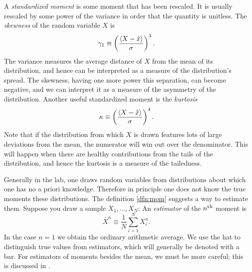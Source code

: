 \begin{example*}{}{}
A {\it standardized moment} is some moment
that has been rescaled. It is usually rescaled by some power of the variance in
order that the quantity is unitless. The {\it skewness} of
the random variable $X$ is
\begin{equation*}
\gamma_1\equiv\left(\frac{\ev{X-\hat{x}}}{\sigma}\right)^3.
\end{equation*}
The variance measures the average distance of $X$ from the mean of its
distribution, and hence can be interpreted as a measure of the distribution's
spread. The skewness, having one more power this separation, can become
negative, and we can interpret it as a measure of the asymmetry of the
distribution. Another useful standardized moment is the {\it kurtosis}
\begin{equation*}
\kappa\equiv\left(\frac{\ev{X-\hat{x}}}{\sigma}\right)^4.
\end{equation*}
Note that if the distribution from
which $X$ is drawn features lots of large deviations from the mean, the
numerator will win out over the denominator. This will happen when there are 
healthy contributions from the tails of the distribution, and hence the kurtosis
is a measure of the tailedness.
\end{example*}

Generally in the lab, one draws random variables from distributions
about which one has no a priori knowledge. Therefore in principle one
does not know the true moments these distributions. The
definition \eqref{dfn:mom} suggests a way to estimate them. 
Suppose you draw a sample $X_1,...,X_N$:
  An {\it estimator} of the $n{}^{\rm th}$ moment is
  \begin{equation}
    \bar{X}^n\equiv\frac{1}{N}\sum_{i=1}^N X_i^n.
  \end{equation}
In the case $n=1$ we obtain the ordinary arithmetic average.
We use the hat to distinguish true values from estimators, which will
generally be denoted with a bar. For estimators of moments besides the
mean, we must be more careful; this is discussed in .

